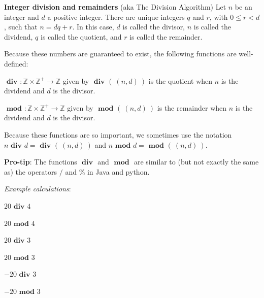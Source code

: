 
{\bf Integer division and remainders} (aka The Division Algorithm) Let $n$ be an integer 
and $d$ a positive integer. There are unique integers $q$ and $r$, with $0 \leq r < d$, such that 
$n = dq + r$. In this case, $d$ is called the divisor, $n$ is called the dividend, 
$q$ is called the quotient, 
and $r$ is called the remainder. 

Because these numbers are guaranteed to exist, the following functions are well-defined: 

$\textbf{ div } : \mathbb{Z} \times \mathbb{Z}^+ \to \mathbb{Z}$ given by $\textbf{ div } ( ~(n,d)~)$ 
is the quotient when $n$ is the dividend and $d$ is the divisor.

$\textbf{ mod } : \mathbb{Z} \times \mathbb{Z}^+ \to \mathbb{Z}$ given by $\textbf{ mod } ( ~(n,d)~)$ 
is the remainder when $n$ is the dividend and $d$ is the divisor.

Because these functions are so important, we sometimes use the notation
$n \textbf{ div } d = \textbf{ div } ( ~(n,d)~)$ and $n \textbf{ mod } d = \textbf{ mod } (~(n,d)~)$.


{\bf Pro-tip}: The functions $\textbf{ div }$ and $\textbf{ mod }$ are similar to (but not exactly the same as) 
the operators $/$ and $\%$ in Java and python.

\vfill

{\it Example calculations}:

$20 \textbf{ div } 4$

\vspace{20pt}

$20 \textbf{ mod } 4$

\vspace{20pt}

$20 \textbf{ div } 3$

\vspace{20pt}

$20 \textbf{ mod } 3$

\vspace{20pt}

$-20 \textbf{ div } 3$

\vspace{20pt}

$-20 \textbf{ mod } 3$

\vfill